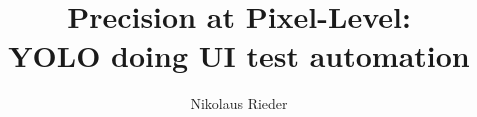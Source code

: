 \documentclass[Bachelor,BIC,english,fhCitStyle,IEEE]{BASE/twbook} %
\title{Precision at Pixel-Level:\\YOLO doing UI test automation}
\author{Nikolaus Rieder}
\begin{document}
\maketitle

\end{document}
